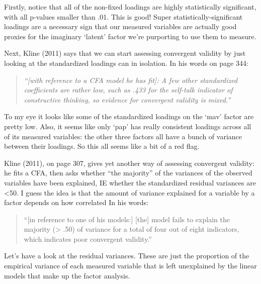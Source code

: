\documentclass[
  letterpaper,
  DIV=11,
  numbers=noendperiod]{scrreprt}
\begin{document}
Firstly, notice that all of the non-fixed loadings are highly
statistically significant, with all p-values smaller than .01. This is
good! Super statistically-significant loadings are a necessary sign that
our measured variables are actually good proxies for the imaginary
`latent' factor we're purporting to use them to measure.

Next, Kline (2011) says that we can start assessing convergent validity
by just looking at the standardized loadings can in isolation. In his
words on page 344:

\begin{quote}
\emph{``{[}with reference to a CFA model he has fit{]}: A few other
standardized coefficients are rather low, such as .433 for the self-talk
indicator of constructive thinking, so evidence for convergent validity
is mixed.''}
\end{quote}

To my eye it looks like some of the standardized loadings on the `mav'
factor are pretty low. Also, it seems like only `pap' has really
consistent loadings across all of its measured variables: the other
three factors all have a bunch of variance between their loadings. So
this all seems like a bit of a red flag.

Kline (2011), on page 307, gives yet another way of assessing convergent
validity: he fits a CFA, then asks whether ``the majority'' of the
variances of the observed variables have been explained, IE whether the
standardized residual variances are \textless50. I guess the idea is
that the amount of variance explained for a variable by a factor depends
on how correlated In his words:

\begin{quote}
``{[}in reference to one of his models:{]} {[}the{]} model fails to
explain the majority (\textgreater{} .50) of variance for a total of
four out of eight indicators, which indicates poor convergent
validity.''
\end{quote}

Let's have a look at the residual variances. These are just the
proportion of the empirical variance of each measured variable that is
left unexplained by the linear models that make up the factor analysis.
\end{document}
